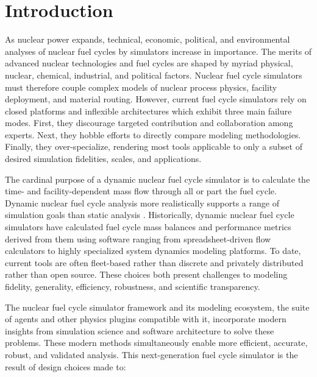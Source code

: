 
\section{Introduction}



As nuclear power expands, technical, economic, political, and environmental
analyses of nuclear fuel cycles by simulators increase in importance. The
merits of advanced nuclear technologies and fuel cycles are
shaped by myriad physical, nuclear, chemical, industrial, and political
factors. Nuclear fuel cycle simulators must therefore couple complex models of
nuclear process physics, facility deployment, and material routing. However,
current fuel cycle simulators rely on closed platforms and inflexible
architectures which exhibit three main failure modes. First, they discourage
targeted contribution and collaboration among experts. Next, they hobble
efforts to directly compare modeling methodologies. Finally, they
over-specialize, rendering most tools applicable to only a subset of desired
simulation fidelities, scales, and applications.

The cardinal purpose of a dynamic nuclear fuel cycle simulator is to calculate
the time- and facility-dependent mass flow through all or part the fuel cycle.
Dynamic nuclear fuel cycle analysis more realistically supports a range of
simulation goals than static analysis \cite{piet_dynamic_2011}. Historically,
dynamic nuclear fuel cycle simulators have calculated fuel cycle mass balances
and performance metrics derived from them using software ranging from
spreadsheet-driven flow calculators to highly specialized system dynamics
modeling platforms. To date, current tools are often fleet-based rather than
discrete and privately distributed rather than open source. These choices both
present challenges to modeling fidelity, generality, efficiency, robustness,
and scientific transparency.

The \Cyclus nuclear fuel cycle simulator framework and its modeling ecosystem, 
the suite of agents and other physics plugins compatible with it,
incorporate modern insights from simulation science and software architecture
to solve these problems.  These modern methods simultaneously enable more
efficient, accurate, robust, and validated analysis.  This next-generation fuel
cycle simulator is the result of design choices made to:

